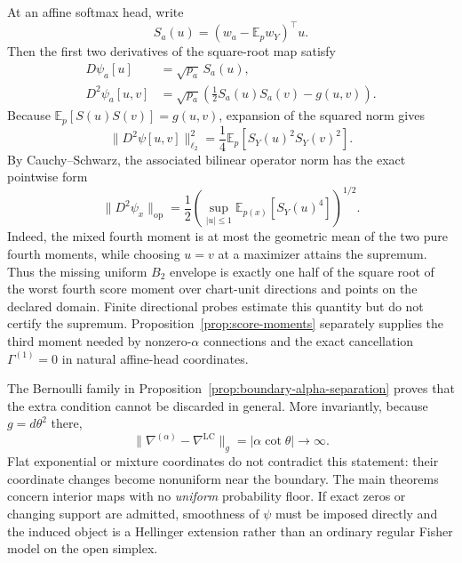 \documentclass[11pt]{article}
\theoremstyle{definition}
\theoremstyle{remark}
\newcommand{\E}{\mathbb{E}}
\newcommand{\LC}{\mathrm{LC}}
\newcommand{\op}{\mathrm{op}}
\begin{document}
At an affine softmax head, write
\begin{equation}
    S_a(u)=(w_a-\E_pw_Y)^\top u.
\end{equation}
Then the first two derivatives of the square-root map satisfy
\begin{align}
    D\psi_a[u]&=\sqrt{p_a}\,S_a(u),\label{eq:affine-sqrt-first}\\
    D^2\psi_a[u,v]
    &=\sqrt{p_a}\left(\frac12S_a(u)S_a(v)-g(u,v)\right).
    \label{eq:affine-sqrt-second}
\end{align}
Because $\E_p[S(u)S(v)]=g(u,v)$, expansion of the squared norm gives
\begin{equation}
    \|D^2\psi[u,v]\|_{\ell_2}^2
    =\frac14\E_p[S_Y(u)^2S_Y(v)^2].
    \label{eq:b2-fourth-moment}
\end{equation}
By Cauchy--Schwarz, the associated bilinear operator norm has the exact pointwise form
\begin{equation}
    \|D^2\psi_x\|_{\op}
    =\frac12
      \left(
        \sup_{|u|\le1}\E_{p(x)}[S_Y(u)^4]
      \right)^{1/2}.
    \label{eq:b2-exact-fourth-envelope}
\end{equation}
Indeed, the mixed fourth moment is at most the geometric mean of the two pure fourth moments, while choosing $u=v$ at a maximizer attains the supremum. Thus the missing uniform $B_2$ envelope is exactly one half of the square root of the worst fourth score moment over chart-unit directions and points on the declared domain. Finite directional probes estimate this quantity but do not certify the supremum. Proposition~\ref{prop:score-moments} separately supplies the third moment needed by nonzero-$\alpha$ connections and the exact cancellation $\Gamma^{(1)}=0$ in natural affine-head coordinates.

The Bernoulli family in Proposition~\ref{prop:boundary-alpha-separation} proves that the extra condition cannot be discarded in general. More invariantly, because $g=d\theta^2$ there,
\begin{equation}
    \|\nabla^{(\alpha)}-\nabla^{\LC}\|_g
    =|\alpha\cot\theta|\longrightarrow\infty.
\end{equation}
Flat exponential or mixture coordinates do not contradict this statement: their coordinate changes become nonuniform near the boundary. The main theorems concern interior maps with no \emph{uniform} probability floor. If exact zeros or changing support are admitted, smoothness of $\psi$ must be imposed directly and the induced object is a Hellinger extension rather than an ordinary regular Fisher model on the open simplex.
\end{document}
